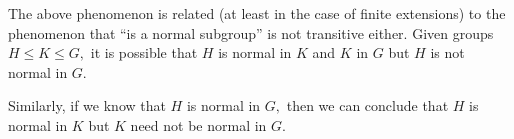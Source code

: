 \begin{rem}
    The above phenomenon is related (at least in the case of finite extensions) to the phenomenon that ``is a normal subgroup'' is not transitive either. Given groups $H \le K \le G,$ it is possible that $H$ is normal in $K$ and $K$ in $G$ but $H$ is not normal in $G.$ 

    Similarly, if we know that $H$ is normal in $G,$ then we can conclude that $H$ is normal in $K$ but $K$ need not be normal in $G.$
\end{rem}